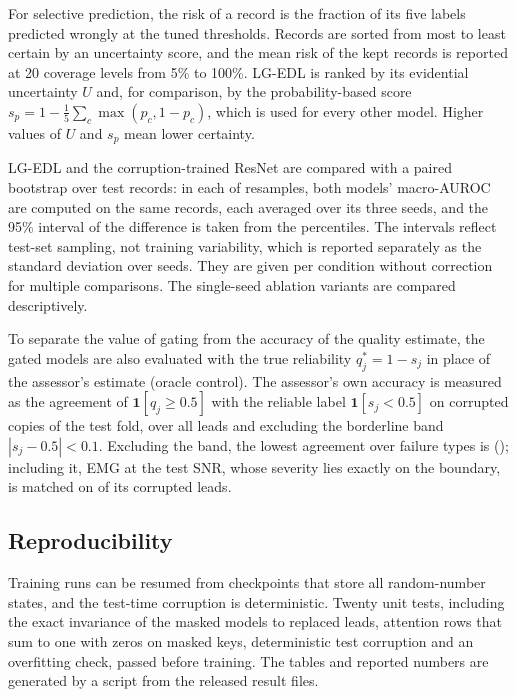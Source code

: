 For selective prediction, the risk of a record is the fraction of its five labels predicted wrongly at the tuned
thresholds. Records are sorted from most to least certain by an uncertainty score, and the mean risk of the kept
records is reported at 20 coverage levels from 5\% to 100\%. LG-EDL is ranked by its evidential uncertainty $U$ and,
for comparison, by the probability-based score $s_p=1-\frac{1}{5}\sum_c\max(p_c,1-p_c)$, which is used for every
other model. Higher values of $U$ and $s_p$ mean lower certainty.

LG-EDL and the corruption-trained ResNet are compared with a paired bootstrap over test records: in each of
\bootNBoot{} resamples, both models' macro-AUROC are computed on the same records, each averaged over its three
seeds, and the 95\% interval of the difference is taken from the percentiles. The intervals reflect test-set
sampling, not training variability, which is reported separately as the standard deviation over seeds. They are
given per condition without correction for multiple comparisons. The single-seed ablation variants are compared
descriptively.

To separate the value of gating from the accuracy of the quality estimate, the gated models are also evaluated with
the true reliability $q^\ast_j=1-s_j$ in place of the assessor's estimate (oracle control). The assessor's own
accuracy is measured as the agreement of $\mathbf{1}[q_j\ge0.5]$ with the reliable label $\mathbf{1}[s_j<0.5]$ on
corrupted copies of the test fold, over all leads and excluding the borderline band $|s_j-0.5|<0.1$. Excluding the
band, the lowest agreement over failure types is \sqaGate{} (\sqaGateType); including it, EMG at the test SNR, whose
severity lies exactly on the boundary, is matched on \sqaEmgTestCorrupted{} of its corrupted leads.

\subsection{Reproducibility}
\label{sec:setup-repro}
Training runs can be resumed from checkpoints that store all random-number states, and the test-time corruption is
deterministic. Twenty unit tests, including the exact invariance of the masked models to replaced leads, attention
rows that sum to one with zeros on masked keys, deterministic test corruption and an overfitting check, passed
before training. The tables and reported numbers are generated by a script from the released result files.
